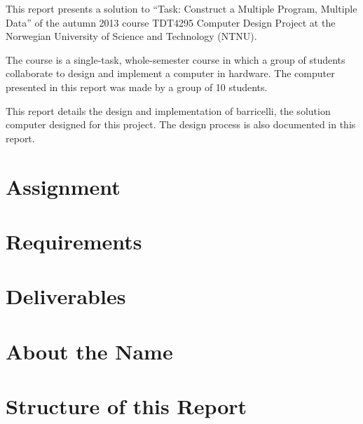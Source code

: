 This report presents a solution to ``Task: Construct a Multiple Program, Multiple Data'' of the autumn 2013 course TDT4295 Computer Design Project at the Norwegian University of Science and Technology (NTNU).

The course is a single-task, whole-semester course in which a group of students collaborate to design and implement a computer in hardware.
The computer presented in this report was made by a group of 10 students.

This report details the design and implementation of \Gls{barricelli}, the solution computer designed for this project.
The design process is also documented in this report.

\section{Assignment}



\section{Requirements}



\section{Deliverables}



\section{About the Name}



\section{Structure of this Report}



